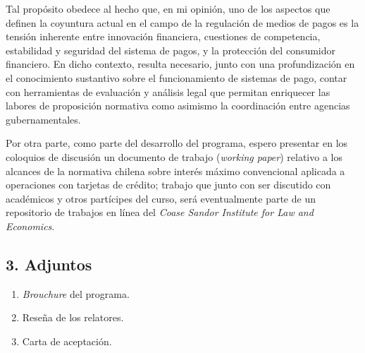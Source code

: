 \documentclass[spanish,]{article}
\providecommand{\tightlist}{%
  \setlength{\itemsep}{0pt}\setlength{\parskip}{0pt}}
\begin{document}
Tal propósito obedece al hecho que, en mi opinión, uno de los aspectos
que definen la coyuntura actual en el campo de la regulación de medios
de pagos es la tensión inherente entre innovación financiera,
cuestiones de competencia, estabilidad y seguridad del sistema de pagos,
y la protección del consumidor financiero. En dicho contexto, resulta
necesario, junto con una profundización en el conocimiento sustantivo
sobre el funcionamiento de sistemas de pago, contar con herramientas de
evaluación y análisis legal que permitan enriquecer las labores de
proposición normativa como asimismo la coordinación entre agencias
gubernamentales.

Por otra parte, como parte del desarrollo del programa, espero presentar
en los coloquios de discusión un documento de trabajo (\emph{working
paper}) relativo a los alcances de la normativa chilena sobre interés
máximo convencional aplicada a operaciones con
tarjetas de crédito; trabajo que junto con ser discutido con académicos
y otros partícipes del curso, será eventualmente parte de un repositorio
de trabajos en línea del \emph{Coase Sandor Institute for Law and
Economics}.

\subsection{3. Adjuntos}\label{adjuntos}

\begin{enumerate}
\def\labelenumi{\arabic{enumi}.}
\tightlist
\item
  \emph{Brouchure} del programa.
\item
  Reseña de los relatores.
\item
  Carta de aceptación.
\end{enumerate}
\end{document}
